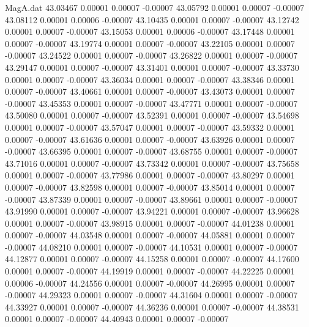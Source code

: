 \begin{filecontents}{MagA.dat}
  43.03467    0.00001    0.00007   -0.00007
  43.05792    0.00001    0.00007   -0.00007
  43.08112    0.00001    0.00006   -0.00007
  43.10435    0.00001    0.00007   -0.00007
  43.12742    0.00001    0.00007   -0.00007
  43.15053    0.00001    0.00006   -0.00007
  43.17448    0.00001    0.00007   -0.00007
  43.19774    0.00001    0.00007   -0.00007
  43.22105    0.00001    0.00007   -0.00007
  43.24522    0.00001    0.00007   -0.00007
  43.26822    0.00001    0.00007   -0.00007
  43.29147    0.00001    0.00007   -0.00007
  43.31401    0.00001    0.00007   -0.00007
  43.33730    0.00001    0.00007   -0.00007
  43.36034    0.00001    0.00007   -0.00007
  43.38346    0.00001    0.00007   -0.00007
  43.40661    0.00001    0.00007   -0.00007
  43.43073    0.00001    0.00007   -0.00007
  43.45353    0.00001    0.00007   -0.00007
  43.47771    0.00001    0.00007   -0.00007
  43.50080    0.00001    0.00007   -0.00007
  43.52391    0.00001    0.00007   -0.00007
  43.54698    0.00001    0.00007   -0.00007
  43.57047    0.00001    0.00007   -0.00007
  43.59332    0.00001    0.00007   -0.00007
  43.61636    0.00001    0.00007   -0.00007
  43.63926    0.00001    0.00007   -0.00007
  43.66395    0.00001    0.00007   -0.00007
  43.68755    0.00001    0.00007   -0.00007
  43.71016    0.00001    0.00007   -0.00007
  43.73342    0.00001    0.00007   -0.00007
  43.75658    0.00001    0.00007   -0.00007
  43.77986    0.00001    0.00007   -0.00007
  43.80297    0.00001    0.00007   -0.00007
  43.82598    0.00001    0.00007   -0.00007
  43.85014    0.00001    0.00007   -0.00007
  43.87339    0.00001    0.00007   -0.00007
  43.89661    0.00001    0.00007   -0.00007
  43.91990    0.00001    0.00007   -0.00007
  43.94221    0.00001    0.00007   -0.00007
  43.96628    0.00001    0.00007   -0.00007
  43.98915    0.00001    0.00007   -0.00007
  44.01238    0.00001    0.00007   -0.00007
  44.03548    0.00001    0.00007   -0.00007
  44.05881    0.00001    0.00007   -0.00007
  44.08210    0.00001    0.00007   -0.00007
  44.10531    0.00001    0.00007   -0.00007
  44.12877    0.00001    0.00007   -0.00007
  44.15258    0.00001    0.00007   -0.00007
  44.17600    0.00001    0.00007   -0.00007
  44.19919    0.00001    0.00007   -0.00007
  44.22225    0.00001    0.00006   -0.00007
  44.24556    0.00001    0.00007   -0.00007
  44.26995    0.00001    0.00007   -0.00007
  44.29323    0.00001    0.00007   -0.00007
  44.31604    0.00001    0.00007   -0.00007
  44.33927    0.00001    0.00007   -0.00007
  44.36236    0.00001    0.00007   -0.00007
  44.38531    0.00001    0.00007   -0.00007
  44.40943    0.00001    0.00007   -0.00007

\end{filecontents}
